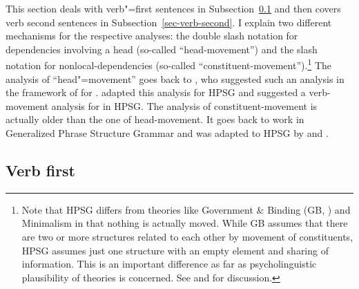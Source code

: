 This section deals with verb"=first sentences in Subsection~\ref{sec-verb-first} and then covers verb
second sentences in Subsection~\ref{sec-verb-second}. I explain two different mechanisms for the
respective analyses: the double slash notation for dependencies involving a head (so-called ``head-movement'') and the slash notation
for nonlocal-dependencies (so-called ``constituent-movement'').\footnote{
  Note that HPSG differs from theories like Government \& Binding (GB, \citealt{Chomsky81a}) and
  Minimalism \citep{Chomsky95a-u} in that nothing is
  actually moved. While GB assumes that there are two or more structures related to each other by
  movement of constituents, HPSG assumes just one structure with an empty element and sharing of
  information. This is an important difference as far as psycholinguistic plausibility of theories
  is concerned. See  and  for discussion.
}
The analysis of ``head"=movement'' goes back to \citet{Jacobson87}, who suggested such an analysis
in the framework of  for . \citet{Borsley89} adapted this analysis for HPSG
and \citet{KW91a,Kiss95a,Kiss95b} suggested a verb-movement analysis for  in HPSG. The analysis of
constituent-movement is actually older than the one of head-movement. It goes back to work in
Generalized Phrase Structure Grammar \citep{Gazdar81a} and was adapted to HPSG by \citet[Section~3.4]{ps} and \citet[Chapter~4]{ps2}. 

\subsection{Verb first}
\label{sec-verb-first}

